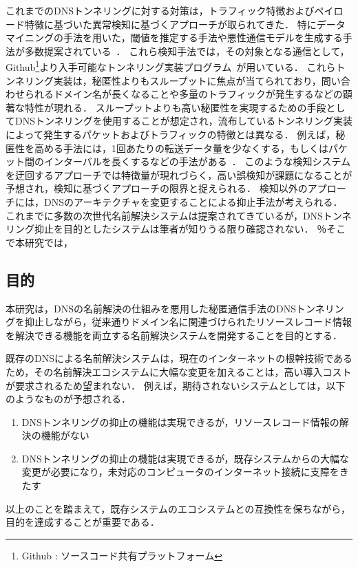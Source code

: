 これまでのDNSトンネリングに対する対策は，トラフィック特徴およびペイロード特徴に基づいた異常検知に基づくアプローチが取られてきた．
特にデータマイニングの手法を用いた，閾値を推定する手法や悪性通信モデルを生成する手法が多数提案されている~\cite{born, cheng, liu, asaf, steadman, jawad}．
これら検知手法では，その対象となる通信として，Github\footnote{Github : ソースコード共有プラットフォーム}より入手可能なトンネリング実装プログラム~\cite{ozymandns, iodine, dnscat2}が用いている．
これらトンネリング実装は，秘匿性よりもスループットに焦点が当てられており，問い合わせられるドメイン名が長くなることや多量のトラフィックが発生するなどの顕著な特性が現れる．
スループットよりも高い秘匿性を実現するための手段としてDNSトンネリングを使用することが想定され，流布しているトンネリング実装によって発生するパケットおよびトラフィックの特徴とは異なる．
例えば，秘匿性を高める手法には，1回あたりの転送データ量を少なくする，もしくはパケット間のインターバルを長くするなどの手法がある~\cite{asaf}．
このような検知システムを迂回するアプローチでは特徴量が現れづらく，高い誤検知が課題になることが予想され，検知に基づくアプローチの限界と捉えられる．
検知以外のアプローチには，DNSのアーキテクチャを変更することによる抑止手法が考えられる．
これまでに多数の次世代名前解決システムは提案されてきているが，DNSトンネリング抑止を目的としたシステムは筆者が知りうる限り確認されない．
％そこで本研究では，


\subsection{目的}
本研究は，DNSの名前解決の仕組みを悪用した秘匿通信手法のDNSトンネリングを抑止しながら，従来通りドメイン名に関連づけられたリソースレコード情報を解決できる機能を両立する名前解決システムを開発することを目的とする．

既存のDNSによる名前解決システムは，現在のインターネットの根幹技術であるため，その名前解決エコシステムに大幅な変更を加えることは，高い導入コストが要求されるため望まれない．
例えば，期待されないシステムとしては，以下のようなものが予想される．
\begin{enumerate}
 \setlength{\itemsep}{-0.5mm}
 \item DNSトンネリングの抑止の機能は実現できるが，リソースレコード情報の解決の機能がない
 \item DNSトンネリングの抑止の機能は実現できるが，既存システムからの大幅な変更が必要になり，未対応のコンピュータのインターネット接続に支障をきたす
\end{enumerate}
以上のことを踏まえて，既存システムのエコシステムとの互換性を保ちながら，目的を達成することが重要である．

